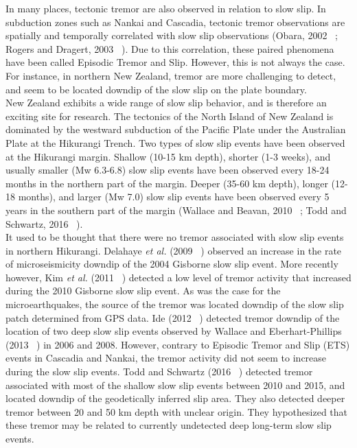 \documentclass[letterpaper, 12pt]{article}
\begin{document}
In many places, tectonic tremor are also observed in relation to slow slip. In subduction zones such as Nankai and Cascadia, tectonic tremor observations are spatially and temporally correlated with slow slip observations (Obara, 2002 ~\cite{OBA_2002}; Rogers and Dragert, 2003 ~\cite{ROG_2003}). Due to this correlation, these paired phenomena have been called Episodic Tremor and Slip. However, this is not always the case. For instance, in northern New Zealand, tremor are more challenging to detect, and seem to be located downdip of the slow slip on the plate boundary. \\

New Zealand exhibits a wide range of slow slip behavior, and is therefore an exciting site for research. The tectonics of the North Island of New Zealand is dominated by the westward subduction of the Pacific Plate under the Australian Plate at the Hikurangi Trench. Two types of slow slip events have been observed at the Hikurangi margin. Shallow (10-15 km depth), shorter (1-3 weeks), and usually smaller (Mw 6.3-6.8) slow slip events have been observed every 18-24 months in the northern part of the margin. Deeper (35-60 km depth), longer (12-18 months), and larger (Mw 7.0) slow slip events have been observed every 5 years in the southern part of the margin (Wallace and Beavan, 2010 ~\cite{WAL_2010}; Todd and Schwartz, 2016 ~\cite{TOD_2016}).\\

It used to be thought that there were no tremor associated with slow slip events in northern Hikurangi. Delahaye \textit{et al.} (2009 ~\cite{DEL_2009}) observed an increase in the rate of microseismicity downdip of the 2004 Gisborne slow slip event. More recently however, Kim \textit{et al.} (2011 ~\cite{KIM_2011}) detected a low level of tremor activity that increased during the 2010 Gisborne slow slip event. As was the case for the microearthquakes, the source of the tremor was located downdip of the slow slip patch determined from GPS data. Ide (2012 ~\cite{IDE_2012}) detected tremor downdip of the location of two deep slow slip events observed by Wallace and Eberhart-Phillips (2013 ~\cite{WAL_2013}) in 2006 and 2008. However, contrary to Episodic Tremor and Slip (ETS) events in Cascadia and Nankai, the tremor activity did not seem to increase during the slow slip events. Todd and Schwartz (2016 ~\cite{TOD_2016}) detected tremor associated with most of the shallow slow slip events between 2010 and 2015, and located downdip of the geodetically inferred slip area. They also detected deeper tremor between 20 and 50 km depth with unclear origin. They hypothesized that these tremor may be related to currently undetected deep long-term slow slip events.\\
\end{document}
